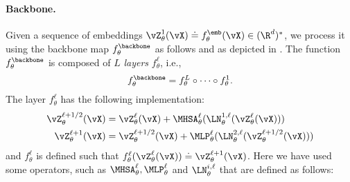 \documentclass[../../book-main.tex]{subfiles}
\begin{document}
\paragraph{Backbone.} Given a sequence of embeddings \(\vZ_{\theta}^{1}(\vX) \doteq f_{\theta}^{\emb}(\vX) \in (\R^{d})^{*}\), we process it using the backbone map \(f_{\theta}^{\backbone}\) as follows and as depicted in . The function \(f_{\theta}^{\backbone}\) is composed of \(L\) \textit{layers} \(f_{\theta}^{\ell}\), i.e.,
\begin{equation}
    f_{\theta}^{\backbone} = f_{\theta}^{L} \circ \cdots \circ f_{\theta}^{1}.
\end{equation}
 The layer \(f_{\theta}^{\ell}\) has the following implementation:
\begin{align}\label{eq:vit-res-block}
    \vZ_{\theta}^{\ell + 1/2}(\vX)
    &= \vZ_{\theta}^{\ell}(\vX) + \MHSA_{\theta}^{\ell}(\LN_{\theta}^{1, \ell}(\vZ_{\theta}^{\ell}(\vX))) \\ 
    \vZ_{\theta}^{\ell + 1}(\vX)
    &= \vZ_{\theta}^{\ell + 1/2}(\vX) + \MLP_{\theta}^{\ell}(\LN_{\theta}^{2, \ell}(\vZ_{\theta}^{\ell + 1/2}(\vX)))
\end{align}
and \(f_{\theta}^{\ell}\) is defined such that \(f_{\theta}^{\ell}(\vZ_{\theta}^{\ell}(\vX)) \doteq \vZ_{\theta}^{\ell + 1}(\vX)\). Here we have used some operators, such as \(\MHSA_{\theta}^{\ell}, \MLP_{\theta}^{\ell}\) and \(\LN_{\theta}^{i, \ell}\) that are defined as follows:
\end{document}
